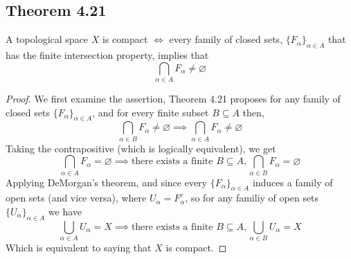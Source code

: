 \documentclass[../../main.tex]{subfiles}
\begin{document}
\subsection{Theorem 4.21}
\begin{wts}
A topological space $X$ is compact $\iff$ every family of closed sets, $\{F_\alpha\}_{\alpha\in A}$ that has the finite intersection property, implies that 
\[
\bigcap_{\alpha\in A}F_\alpha\neq\varnothing
\]
\end{wts}
\newcommand{\fa}{\{F_\alpha\}_{\alpha\in A}}
\newcommand{\ua}{\{U_\alpha\}_{\alpha\in A}}
\begin{proof}
We first examine the assertion, Theorem 4.21 proposes for any family of closed sets $\{F_\alpha\}_{\alpha\in A}$, and for every finite subset $B\subseteq A$ then,
\[
\bigcap_{\alpha\in B} F_\alpha\neq\varnothing\implies\bigcap_{\alpha\in A}F_\alpha\neq\varnothing
\]
Taking the contrapositive (which is logically equivalent), we get
\[
\bigcap_{\alpha\in A}F_\alpha=\varnothing\implies \text{there exists a finite } B\subseteq A, \bigcap_{\alpha\in B}F_\alpha = \varnothing
\]
Applying DeMorgan's theorem, and since every $\fa$ induces a family of open sets (and vice versa), where $U_\alpha=F_\alpha^c$, so for any familiy of open sets $\ua$ we have
\[
\bigcup_{\alpha\in A}U_\alpha = X\implies \text{there exists a finite } B\subseteq A, \bigcup_{\alpha\in B}U_\alpha = X
\]
Which is equivalent to saying that $X$ is compact.
\end{proof}
\end{document}
